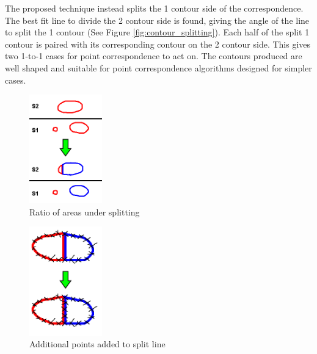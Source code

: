 \documentclass[11p, titlepage]{article}
\begin{document}
The proposed technique instead splits the 1 contour side of the correspondence. The best fit line to divide the 2 contour side is found, giving the angle of the line to split the 1 contour (See Figure \ref{fig:contour_splitting}). Each half of the split 1 contour is paired with its corresponding contour on the 2 contour side. This gives two 1-to-1 cases for point correspondence to act on. The contours produced are well shaped and suitable for point correspondence algorithms designed for simpler cases.

\begin{figure}[h!]
\centering
\includegraphics[width=0.28\textwidth]{diagrams/ratio_of_area}
\caption{Ratio of areas under splitting \label{fig:ratio_of_area}}
\end{figure}

\begin{figure}[h!]
\centering
\includegraphics[width=0.28\textwidth]{diagrams/split_line_points}
\caption{Additional points added to split line \label{fig:split_line_points}}
\end{figure}
\end{document}
